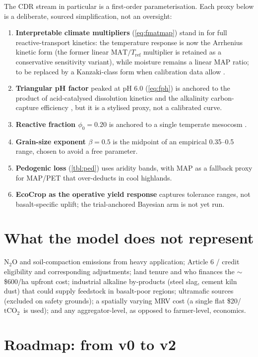 \documentclass[openany]{book}
\newcommand{\tco}{\ensuremath{\mathrm{tCO_2}}}
\begin{document}
The CDR stream in particular is a first-order parameterisation. Each proxy below
is a deliberate, sourced simplification, not an oversight:
%
\begin{enumerate}
\item \textbf{Interpretable climate multipliers} (\autoref{eq:fmatmap}) stand in
for full reactive-transport kinetics: the temperature response is now the
Arrhenius kinetic form (the former linear $\mathrm{MAT}/T_{\text{ref}}$
multiplier is retained as a conservative sensitivity variant), while moisture
remains a linear MAP ratio; to be replaced by a Kanzaki-class form when
calibration data allow \citep{kanzaki2023}.
\item \textbf{Triangular pH factor} peaked at pH 6.0 (\autoref{eq:fph}) is
anchored to the product of acid-catalysed dissolution kinetics and the
alkalinity carbon-capture efficiency \citep{bertagni2022, holden2024,
power2025}, but it is a stylised proxy, not a calibrated curve.
\item \textbf{Reactive fraction $\phi_0 = 0.20$} is anchored to a single
temperate mesocosm \citep{lewis2021}.
\item \textbf{Grain-size exponent $\beta=0.5$} is the midpoint of an empirical
0.35--0.5 range, chosen to avoid a free parameter.
\item \textbf{Pedogenic loss} (\autoref{tbl:ped}) uses aridity bands, with MAP as
a fallback proxy for MAP/PET that over-deducts in cool highlands.
\item \textbf{EcoCrop as the operative yield response} captures tolerance ranges,
not basalt-specific uplift; the trial-anchored Bayesian arm is not yet run.
\end{enumerate}

\section{What the model does not represent}

N$_2$O and soil-compaction emissions from heavy application; Article 6 / credit
eligibility and corresponding adjustments; land tenure and who finances the
$\sim$\$600/ha upfront cost; industrial alkaline by-products (steel slag, cement
kiln dust) that could supply feedstock in basalt-poor regions; ultramafic
sources (excluded on safety grounds); a spatially varying MRV cost (a single flat
\$20/\tco\ is used); and any aggregator-level, as opposed to farmer-level,
economics.

\section{Roadmap: from v0 to v2}
\end{document}
